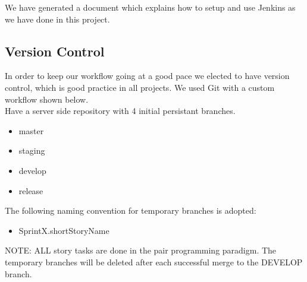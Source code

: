 \documentclass[11pt]{report}
\begin{document}
We have generated a document which explains how to setup and use Jenkins as we have done in this project. 


\subsection{Version Control}

In order to keep our workflow going at a good pace we elected to have version control, which is good practice in all projects. We used Git with a custom workflow shown below. \\

Have a server side repository with 4 initial persistant branches.
\begin{itemize}
\item master
\item staging
\item develop
\item release
\end{itemize}

The following naming convention for temporary branches is adopted: 

\begin{itemize}
\item SprintX.shortStoryName
\end{itemize}

NOTE: ALL story tasks are done in the pair programming paradigm. The temporary branches will be deleted after each successful merge to the DEVELOP branch.
\end{document}
